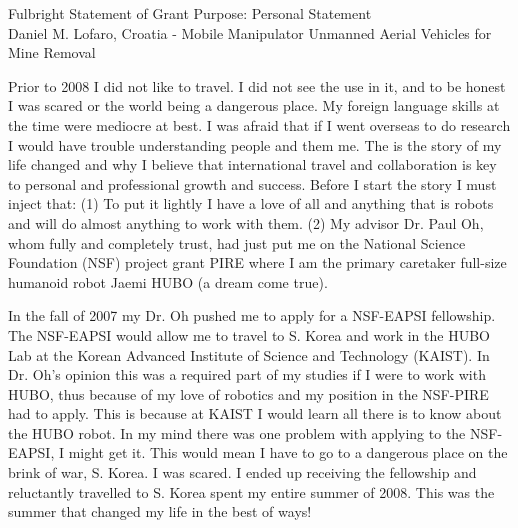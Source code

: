 \documentclass[12pt]{article}
\begin{document}
\begin{center}
Fulbright Statement of Grant Purpose: Personal Statement\\
Daniel M. Lofaro, Croatia - Mobile Manipulator Unmanned Aerial Vehicles for Mine Removal\\

\end{center}

\normalsize
Prior to 2008 I did not like to travel. 
I did not see the use in it, and to be honest I was scared or the world being a dangerous place.  
My foreign language skills at the time were mediocre at best.  
I was afraid that if I went overseas to do research I would have trouble understanding people and them me.  
The is the story of my life changed and why I believe that international travel and collaboration is key to personal and professional growth and success.
Before I start the story I must inject that: 
(1) To put it lightly I have a love of all and anything that is robots and will do almost anything to work with them.  
(2) My advisor Dr. Paul Oh, whom fully and completely trust, had just put me on the National Science Foundation (NSF) project grant PIRE where I am the primary caretaker full-size humanoid robot Jaemi HUBO (a dream come true).  

In the fall of 2007 my Dr. Oh pushed me to apply for a NSF-EAPSI fellowship.  
The NSF-EAPSI would allow me to travel to S. Korea and work in the HUBO Lab at the Korean Advanced Institute of Science and Technology (KAIST).  
In Dr. Oh's opinion this was a required part of my studies if I were to work with HUBO, thus because of my love of robotics and my position in the NSF-PIRE had to apply.
This is because at KAIST I would learn all there is to know about the HUBO robot.
In my mind there was one problem with applying to the NSF-EAPSI, I might get it.
This would mean I have to go to a dangerous place on the brink of war, S. Korea.
I was scared.  
I ended up receiving the fellowship and reluctantly travelled to S. Korea spent my entire summer of 2008.  
This was the summer that changed my life in the best of ways!  

\end{document}

